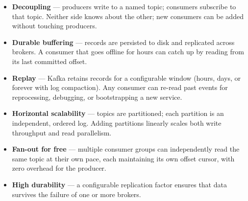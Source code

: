 \begin{itemize}
  \item \textbf{Decoupling} — producers write to a named topic; consumers subscribe to that topic.
        Neither side knows about the other; new consumers can be added without touching producers.
  \item \textbf{Durable buffering} — records are persisted to disk and replicated across brokers.
        A consumer that goes offline for hours can catch up by reading from its last committed offset.
  \item \textbf{Replay} — Kafka retains records for a configurable window (hours, days, or forever with
        log compaction). Any consumer can re-read past events for reprocessing, debugging, or bootstrapping a new service.
  \item \textbf{Horizontal scalability} — topics are partitioned; each partition is an independent,
        ordered log. Adding partitions linearly scales both write throughput and read parallelism.
  \item \textbf{Fan-out for free} — multiple consumer groups can independently read the same topic
        at their own pace, each maintaining its own offset cursor, with zero overhead for the producer.
  \item \textbf{High durability} — a configurable replication factor ensures that data survives the
        failure of one or more brokers.
\end{itemize}
